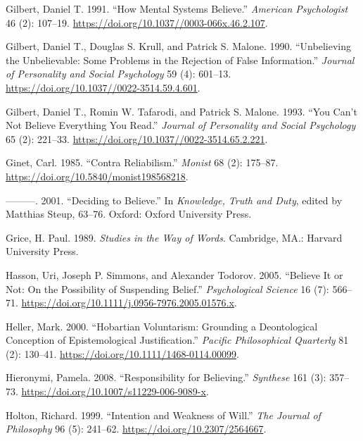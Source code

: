 \documentclass[
  11pt,
  letterpaper,
  DIV=11,
  numbers=noendperiod,
  oneside]{scrartcl}
\newlength{\cslhangindent}
\newenvironment{CSLReferences}[2] %
 {\begin{list}{}{%
  \setlength{\itemindent}{0pt}
  \setlength{\leftmargin}{0pt}
  \setlength{\parsep}{0pt}
  \ifodd #1
   \setlength{\leftmargin}{\cslhangindent}
   \setlength{\itemindent}{-1\cslhangindent}
  \fi
  \setlength{\itemsep}{#2\baselineskip}}}
 {\end{list}}
\begin{document}
\begin{CSLReferences}{1}{0}
Gilbert, Daniel T. 1991. {``How Mental Systems Believe.''}
\emph{American Psychologist} 46 (2): 107--19.
\url{https://doi.org/10.1037//0003-066x.46.2.107}.

Gilbert, Daniel T., Douglas S. Krull, and Patrick S. Malone. 1990.
{``Unbelieving the Unbelievable: Some Problems in the Rejection of False
Information.''} \emph{Journal of Personality and Social Psychology} 59
(4): 601--13. \url{https://doi.org/10.1037//0022-3514.59.4.601}.

Gilbert, Daniel T., Romin W. Tafarodi, and Patrick S. Malone. 1993.
{``You Can't Not Believe Everything You Read.''} \emph{Journal of
Personality and Social Psychology} 65 (2): 221--33.
\url{https://doi.org/10.1037//0022-3514.65.2.221}.

Ginet, Carl. 1985. {``Contra Reliabilism.''} \emph{Monist} 68 (2):
175--87. \url{https://doi.org/10.5840/monist198568218}.

---------. 2001. {``Deciding to Believe.''} In \emph{Knowledge, Truth
and Duty}, edited by Matthias Steup, 63--76. Oxford: Oxford University
Press.

Grice, H. Paul. 1989. \emph{Studies in the Way of Words}. Cambridge,
MA.: Harvard University Press.

Hasson, Uri, Joseph P. Simmons, and Alexander Todorov. 2005. {``Believe
It or Not: On the Possibility of Suspending Belief.''}
\emph{Psychological Science} 16 (7): 566--71.
\url{https://doi.org/10.1111/j.0956-7976.2005.01576.x}.

Heller, Mark. 2000. {``Hobartian Voluntarism: Grounding a Deontological
Conception of Epistemological Justification.''} \emph{Pacific
Philosophical Quarterly} 81 (2): 130--41.
\url{https://doi.org/10.1111/1468-0114.00099}.

Hieronymi, Pamela. 2008. {``Responsibility for Believing.''}
\emph{Synthese} 161 (3): 357--73.
\url{https://doi.org/10.1007/s11229-006-9089-x}.

Holton, Richard. 1999. {``Intention and Weakness of Will.''} \emph{The
Journal of Philosophy} 96 (5): 241--62.
\url{https://doi.org/10.2307/2564667}.


\end{CSLReferences}
\end{document}
